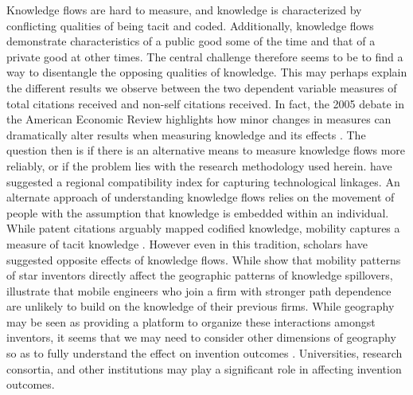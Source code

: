 \documentclass[12pt,letterpaper]{article}
\begin{document}
Knowledge flows are hard to measure, and knowledge is characterized by conflicting qualities of being tacit and coded. Additionally, knowledge flows demonstrate characteristics of a public good some of the time and that of a private good at other times. The central challenge therefore seems to be to find a way to disentangle the opposing qualities of knowledge. This may perhaps explain the different results we observe between the two dependent variable measures of total citations received and non-self citations received. In fact, the 2005 debate in the American Economic Review highlights how minor changes in measures can dramatically alter results when measuring knowledge and its effects \citep*{Henderson2005, Thompson2005}. The question then is if there is an alternative means to measure knowledge flows more reliably, or if the problem lies with the research methodology used herein. \cite{Maurseth2002} have suggested a regional compatibility index for capturing technological linkages. An alternate approach of understanding knowledge flows relies on the movement of people with the assumption that knowledge is embedded within an individual. While patent citations arguably mapped codified knowledge, mobility captures a measure of tacit knowledge \citep{Polanyi1958}. However even in this tradition, scholars have suggested opposite effects of knowledge flows. While \cite{Almeida1997} show that mobility patterns of star inventors directly affect the geographic patterns of knowledge spillovers, \cite{Song2003} illustrate that mobile engineers who join a firm with stronger path dependence are unlikely to build on the knowledge of their previous firms. While geography may be seen as providing a platform to organize these interactions amongst inventors, it seems that we may need to consider other dimensions of geography so as to fully understand the effect on invention outcomes \citep{Bunnell2001}. Universities, research consortia, and other institutions may play a significant role in affecting invention outcomes.
\end{document}
